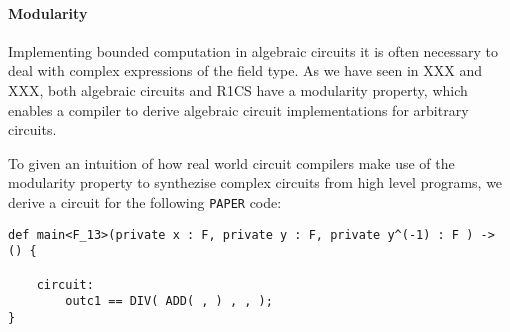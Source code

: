 \paragraph{Modularity} Implementing bounded computation in algebraic circuits it is often necessary to deal with complex expressions of the field type. As we have seen in XXX and XXX, both algebraic circuits and R1CS have a modularity property, which enables a compiler to derive algebraic circuit implementations for arbitrary circuits. 
\begin{example}
To given an intuition of how real world circuit compilers make use of the modularity property to synthezise complex circuits from high level programs, we derive a circuit for the following \texttt{PAPER} code:
\begin{lstlisting}
def main<F_13>(private x : F, private y : F, private y^(-1) : F ) -> () {

	circuit:
		outc1 == DIV( ADD( , ) , , );
}
\end{lstlisting}
\end{example}
